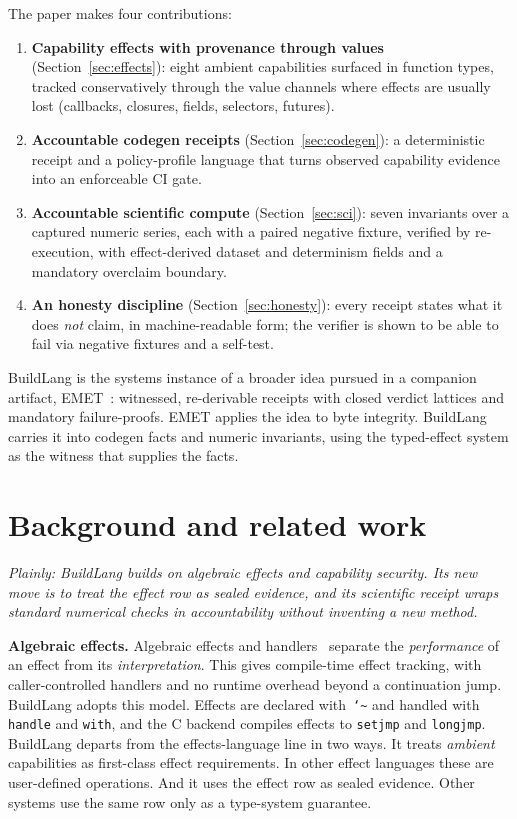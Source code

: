 \documentclass[11pt]{article}
\begin{document}
The paper makes four contributions:
\begin{enumerate}[leftmargin=*,itemsep=2pt]
\item \textbf{Capability effects with provenance through values} (Section~\ref{sec:effects}): eight ambient capabilities surfaced in function types, tracked conservatively through the value channels where effects are usually lost (callbacks, closures, fields, selectors, futures).
\item \textbf{Accountable codegen receipts} (Section~\ref{sec:codegen}): a deterministic receipt and a policy-profile language that turns observed capability evidence into an enforceable CI gate.
\item \textbf{Accountable scientific compute} (Section~\ref{sec:sci}): seven invariants over a captured numeric series, each with a paired negative fixture, verified by re-execution, with effect-derived dataset and determinism fields and a mandatory overclaim boundary.
\item \textbf{An honesty discipline} (Section~\ref{sec:honesty}): every receipt states what it does \emph{not} claim, in machine-readable form; the verifier is shown to be able to fail via negative fixtures and a self-test.
\end{enumerate}

BuildLang is the systems instance of a broader idea pursued in a companion artifact, EMET~\cite{emet}: witnessed, re-derivable receipts with closed verdict lattices and mandatory failure-proofs. EMET applies the idea to byte integrity. BuildLang carries it into codegen facts and numeric invariants, using the typed-effect system as the witness that supplies the facts.

\section{Background and related work}
\emph{Plainly: BuildLang builds on algebraic effects and capability security. Its new move is to treat the effect row as sealed evidence, and its scientific receipt wraps standard numerical checks in accountability without inventing a new method.}

\textbf{Algebraic effects.} Algebraic effects and handlers~\cite{bauerpretnar,eff} separate the \emph{performance} of an effect from its \emph{interpretation}. This gives compile-time effect tracking, with caller-controlled handlers and no runtime overhead beyond a continuation jump. BuildLang adopts this model. Effects are declared with~\texttt{\char`\~} and handled with \texttt{handle} and \texttt{with}, and the C backend compiles effects to \texttt{setjmp} and \texttt{longjmp}. BuildLang departs from the effects-language line in two ways. It treats \emph{ambient} capabilities as first-class effect requirements. In other effect languages these are user-defined operations. And it uses the effect row as sealed evidence. Other systems use the same row only as a type-system guarantee.
\end{document}
